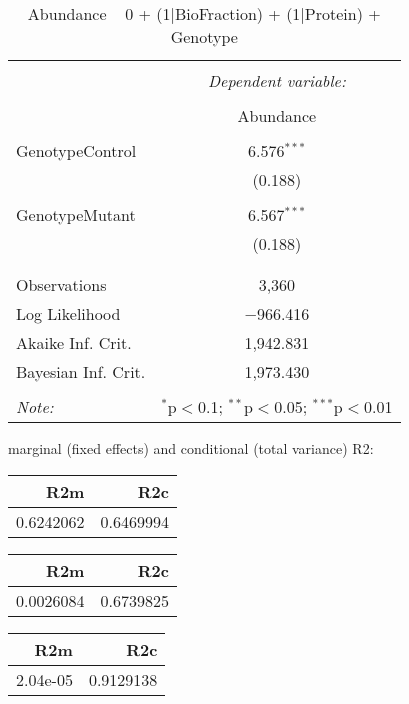 \documentclass[11pt]{report}
\begin{document}
\begin{table}[!htbp] \centering 
  \caption{Abundance ~ 0 + (1|BioFraction) + (1|Protein) + Genotype} 
  \label{} 
\begin{tabular}{@{\extracolsep{5pt}}lc} 
\\[-1.8ex]\hline 
\hline \\[-1.8ex] 
 & \multicolumn{1}{c}{\textit{Dependent variable:}} \\ 
\cline{2-2} 
\\[-1.8ex] & Abundance \\ 
\hline \\[-1.8ex] 
 GenotypeControl & 6.576$^{***}$ \\ 
  & (0.188) \\ 
  & \\ 
 GenotypeMutant & 6.567$^{***}$ \\ 
  & (0.188) \\ 
  & \\ 
\hline \\[-1.8ex] 
Observations & 3,360 \\ 
Log Likelihood & $-$966.416 \\ 
Akaike Inf. Crit. & 1,942.831 \\ 
Bayesian Inf. Crit. & 1,973.430 \\ 
\hline 
\hline \\[-1.8ex] 
\textit{Note:}  & \multicolumn{1}{r}{$^{*}$p$<$0.1; $^{**}$p$<$0.05; $^{***}$p$<$0.01} \\ 
\end{tabular} 
\end{table} 
marginal (fixed effects) and conditional (total variance) R2:

\begin{tabular}{r|r}
\hline
R2m & R2c\\
\hline
0.6242062 & 0.6469994\\
\hline
\end{tabular}

\begin{tabular}{r|r}
\hline
R2m & R2c\\
\hline
0.0026084 & 0.6739825\\
\hline
\end{tabular}

\begin{tabular}{r|r}
\hline
R2m & R2c\\
\hline
2.04e-05 & 0.9129138\\
\hline
\end{tabular}
\end{document}
